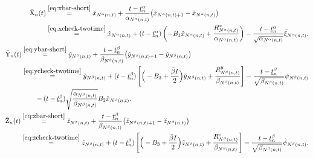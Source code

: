 \documentclass[11pt]{article}
\theoremstyle{plain}
\theoremstyle{definition}
\def\invdiffslow{\tilde{\beta}}
\def\mI{{\bm{I}}}
\newcommand{\xcheck}{{\check{x}}}
\newcommand{\ycheck}{{\check{y}}}
\newcommand{\zcheck}{{\check{z}}}
\newcommand{\xbar}{{\bar{\textnormal{X}}}}
\newcommand{\ybar}{{\bar{\textnormal{Y}}}}
\newcommand{\zbar}{{\bar{\textnormal{Z}}}}
\def\mI{{I}}
\begin{document}
\begin{appendix}
\begin{align}\label{eq:def:xbar}
\begin{split}
    \xbar_{n}(t) 
    & \overset{\eqref{eq:xbar-short}}{=} \xcheck_{ N^\alpha(n,t) } + \frac{t - \underline{t}^\alpha_{n}}{ \alpha_{N^\alpha(n,t)} } \big( \xcheck_{ N^\alpha(n,t) + 1} - \xcheck_{ N^\alpha(n,t)  } \big) \\
    & \overset{\eqref{eq:xcheck-twotime}}{=} \xcheck_{ N^\alpha(n,t) } + (t - \underline{t}^\alpha_{n} ) \left( - B_1 \xcheck_{N^\alpha(n,t)} + \frac{R_{N^\alpha(n,t)}^x}{ \alpha_{N^\alpha(n,t)} } \right) - \frac{t - \underline{t}^\alpha_{n}}{ \sqrt{ \alpha_{N^\alpha(n,t)} } } 
    \tilde{\xi}_{N^\alpha(n,t)}.
\end{split} \\
\label{eq:def:ybar}
\begin{split}
    \ybar_{n}(t) 
    & \overset{\eqref{eq:ybar-short}}{=} \ycheck_{ N^\beta(n,t) } + \frac{t - \underline{t}^\beta_{n}}{\beta_{N^\beta(n,t)}} \big( \ycheck_{ N^\beta(n,t)+1 } - \ycheck_{ N^\beta(n,t) } \big) \\
    & \overset{\eqref{eq:ycheck-twotime}}{=} \ycheck_{ N^\beta(n,t) } + (t - \underline{t}^\beta_{n} ) \left[ \Big(- B_3 + \frac{\invdiffslow \mI}{2} 
    \Big) \ycheck_{N^\beta(n,t)} + \frac{R_{N^\beta(n,t)}^y }{ \beta_{N^\beta(n,t)} } \right] - 
    \frac{t - \underline{t}^\beta_{n}} {\sqrt{ \beta_{N^\beta(n,t)} } }
    \psi_{N^\beta(n,t)} 
    \\
    & \qquad - (t - \underline{t}^\beta_{n}) \sqrt{ \frac{ \alpha_{N^\beta(n,t)} }{ \beta_{N^\beta(n,t)} } } B_2 \xcheck_{N^\beta(n,t)}.
\end{split}\\
\label{eq:def:zbar}
\begin{split}
    \zbar_{n}(t) 
    & \overset{\eqref{eq:zbar-short}}{=} \zcheck_{ N^\beta(n,t) } + \frac{t - \underline{t}^\beta_{n}}{\beta_{N^\beta(n,t)}} \big( \zcheck_{ N^\beta(n,t)+1 } - \zcheck_{ N^\beta(n,t) } \big) \\
    & \overset{\eqref{eq:zcheck-twotime}}{=} \zcheck_{ N^\beta(n,t) } + (t - \underline{t}^\beta_{n} ) \left[ \Big(- B_3 + \frac{\invdiffslow \mI}{2} 
    \Big) \zcheck_{N^\beta(n,t)} + \frac{R_{N^\beta(n,t)}^z }{ \beta_{N^\beta(n,t)} } \right] -  \frac{t - \underline{t}^\beta_{n}}{ \sqrt{ \beta_{N^\beta(n,t)}} } 
    \tilde{\psi}_{N^\beta(n,t)}.
\end{split}
\end{align}


\end{appendix}
\end{document}
